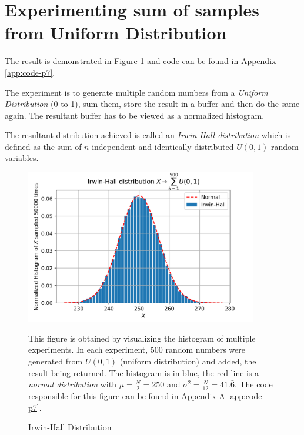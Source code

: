 \documentclass[main.tex]{article}
\begin{document}
    \section[P7: Random number experiment]{Experimenting sum of samples from Uniform Distribution}
    The result is demonstrated in Figure \ref{fig:p7-result} and code can be found in Appendix \ref{app:code-p7}.
    \par The experiment is to generate multiple random numbers from a \emph{Uniform Distribution} (0 to 1), sum them, store the result in a buffer and then do the same again. The resultant buffer has to be viewed as a normalized histogram.
    \par The resultant distribution achieved is called an \emph{Irwin-Hall distribution} which is defined as the sum of $n$ independent and identically distributed $U(0, 1)$ random variables.
    \begin{figure}[h]
        \centering
        \includegraphics[width=0.9\textwidth]{plot_p7.png}
        \caption{Irwin-Hall Distribution}
        \label{fig:p7-result}
        \small This figure is obtained by visualizing the histogram of multiple experiments. In each experiment, 500 random numbers were generated from $U(0, 1)$ (uniform distribution) and added, the result being returned. The histogram is in blue, the red line is a \emph{normal distribution} with $\mu = \frac{N}{2} = 250$ and $\sigma^2 = \frac{N}{12} = 41.\bar{6}$. The code responsible for this figure can be found in Appendix A \ref{app:code-p7}.
    \end{figure}
\end{document}
